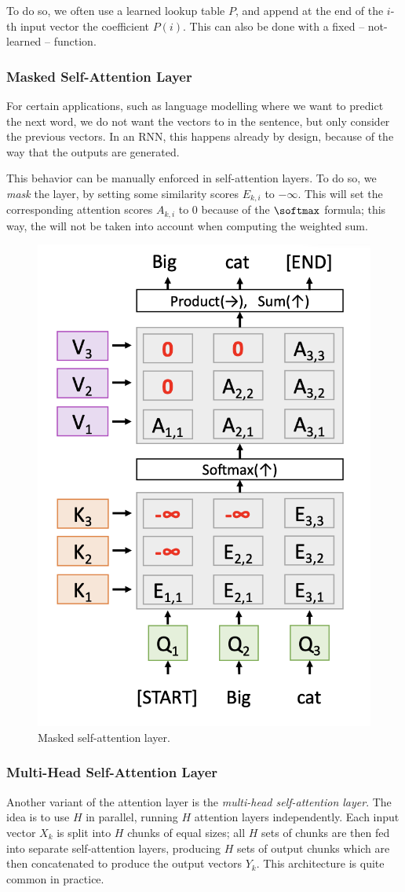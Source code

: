 To do so, we often use a learned lookup table $P$, and append at the end of the $i$-th input vector the coefficient $P(i)$. This can also be done with a fixed -- not-learned -- function.

\subsubsection{Masked Self-Attention Layer}
For certain applications, such as language modelling where we want to predict the next word, we do not want the vectors to  in the sentence, but only consider the previous vectors. In an RNN, this happens already by design, because of the way that the outputs are generated.

This behavior can be manually enforced in self-attention layers. To do so, we \emph{mask} the layer, by setting some similarity scores $E_{k,i}$ to $-\infty$. This will set the corresponding attention scores $A_{k,i}$ to 0 because of the $\softmax$ formula; this way, the  will not be taken into account when computing the weighted sum.

\begin{figure}[H]
    \centering
    \includegraphics[width=.35\textwidth]{images/masked-attention.png}
    \caption{Masked self-attention layer.}
\end{figure}

\subsubsection{Multi-Head Self-Attention Layer}
Another variant of the attention layer is the \emph{multi-head self-attention layer}. The idea is to use $H$  in parallel, running $H$ attention layers independently. Each input vector $X_k$ is split into $H$ chunks of equal sizes; all $H$ sets of chunks are then fed into separate self-attention layers, producing $H$ sets of output chunks which are then concatenated to produce the output vectors $Y_k$. This architecture is quite common in practice.

